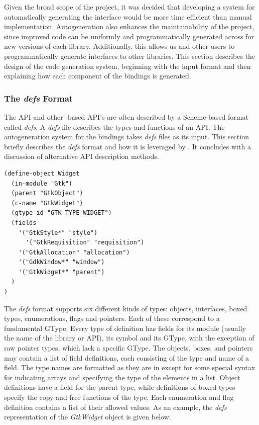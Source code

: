 \documentclass[article]{jss}
\begin{document}
Given the broad scope of the project, it was decided that developing a
system for automatically generating the interface would be more time
efficient than manual implementation. Autogeneration also enhances the
maintainability of the project, since improved code can be uniformly
and programmatically generated across for new versions of each
library. Additionally, this allows us and other users to
programmatically generate interfaces to other libraries. This section
describes the design of the code generation system, beginning with the
input format and then explaining how each component of the bindings is
generated.

\subsubsection[The defs Format]{The \emph{defs} Format}

The  API and other -based API's are often
described by
a Scheme-based format called \emph{defs}. A \emph{defs} file describes
the types
and functions of an API. The autogeneration system for the 
bindings
takes \emph{defs} files as its input. This section briefly describes
the 
\emph{defs} format and how it is leveraged by . It
concludes
with a discussion of alternative API description methods.

\begin{verbatim}
(define-object Widget
  (in-module "Gtk")
  (parent "GtkObject")
  (c-name "GtkWidget")
  (gtype-id "GTK_TYPE_WIDGET")
  (fields
    '("GtkStyle*" "style")
	  '("GtkRequisition" "requisition")
    '("GtkAllocation" "allocation")
    '("GdkWindow*" "window")
    '("GtkWidget*" "parent")
  )
)
\end{verbatim}

The \emph{defs} format supports six different kinds of types: objects,
interfaces, boxed types, enumerations, flags and pointers. Each of
these correspond to a fundamental GType. Every type of definition has
fields for its module (usually the name of the library or API), its
symbol and its GType, with the exception of raw pointer types, which
lack a specific GType. The objects, boxes, and pointers may contain a
list of field definitions, each consisting of the type and name of a
field. The type names are formatted as they are in  except
for some special syntax for indicating arrays and specifying the type
of the elements in a list. Object definitions have a field for the
parent type, while definitions of boxed types specify the copy and
free functions of the type.  Each enumeration and flag definition
contains a list of their allowed values.  As an example, the
\emph{defs} representation of the \emph{GtkWidget} object is given
below.
\end{document}
